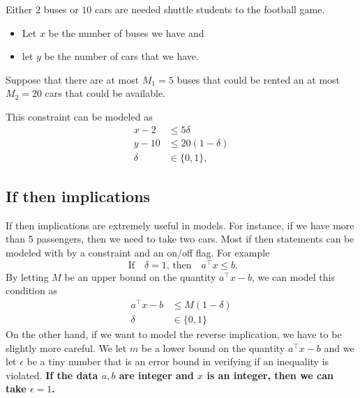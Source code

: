 \begin{example}{}{}
Either $2$ buses or $10$ cars are needed shuttle students to the football game.  
\begin{itemize}
\item Let $x$ be the number of buses we have and 
\item let $y$ be the number of cars that we have.  
\end{itemize}
Suppose that there are at most $M_1 = 5$ buses that could be rented an at most $M_2 = 20$ cars that could be available.

This constraint can be modeled as 
\begin{equation}
\begin{split}
x - 2 &\leq 5\delta\\
y - 10 &\leq 20 (1-\delta)\\
\delta &\in \{0,1\},
\end{split}
\end{equation}
\end{example}
\subsection{If then implications}

If then implications are extremely useful in models.  
For instance, if we have more than 5 passengers, then we need to take two cars.   Most if then statements can be modeled with by a constraint and an on/off flag.  For example
\begin{equation}
\text{ If } \ \ \   \delta = 1 \text{, then  } \ \ \ a^\top x \leq b.
\end{equation}
By letting $M$ be an upper bound on the quantity $a^\top x - b$, we can model this condition as 
\begin{equation}
\begin{split}
a^\top x - b& \leq M(1-\delta)\\
\delta & \in \{0,1\}
\end{split}
\end{equation}
On the other hand, if we want to model the reverse implication, we have to be slightly more careful.  We let $m$ be a lower bound on the quantity $a^\top x - b$ and we let $\epsilon$ be a tiny number that is an error bound in verifying if an inequality is violated.  \textbf{If the data $a,b$ are integer and $x$ is an integer, then we can take $\epsilon = 1$.}

